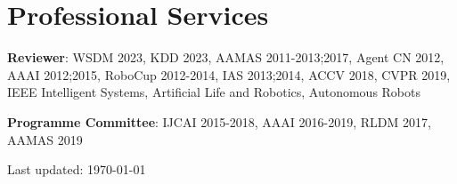 \documentclass[letterpaper,10pt]{article}
\def\footerlink{}
\renewenvironment{itemize}{
  \begin{list}{}{
    \setlength{\leftmargin}{1.5em}
  }
}{
  \end{list}
}
\begin{document}
\section*{Professional Services}
\begin{itemize}
	\item \textbf{Reviewer}: WSDM 2023, KDD 2023, AAMAS 2011-2013;2017, Agent CN 2012, AAAI 2012;2015, RoboCup 2012-2014, IAS 2013;2014, ACCV 2018, CVPR 2019, IEEE Intelligent Systems, Artificial Life and Robotics, Autonomous Robots
	\item \textbf{Programme Committee}: IJCAI 2015-2018, AAAI 2016-2019, RLDM 2017, AAMAS 2019
\end{itemize}

\bigskip

\begin{center}
  \begin{footnotesize}
    Last updated: \today \\
    \href{\footerlink}{\texttt{\footerlink}}
  \end{footnotesize}
\end{center}
\end{document}
